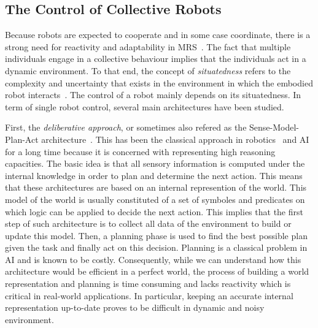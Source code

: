 

  \subsection{The Control of Collective Robots}

    Because robots are expected to cooperate and in some case coordinate, there is a strong need for reactivity and adaptability in MRS~\cite{Iocchi2001, Farinelli2004}. The fact that multiple individuals engage in a collective behaviour implies that the individuals act in a dynamic environment. To that end, the concept of \emph{situatedness} refers to the complexity and uncertainty that exists in the environment in which the embodied robot interacts~\cite{Mataric2008}. The control of a robot mainly depends on its situatedness. In term of single robot control, several main architectures have been studied.

    First, the \emph{deliberative approach}, or sometimes also refered as the Sense-Model-Plan-Act architecture~\cite{Albus1991, Iocchi2001, Mataric2008}. This has been the classical approach in robotics~\cite{Nilsson1984} and AI for a long time because it is concerned with representing high reasoning capacities. The basic idea is that all sensory information is computed under the internal knowledge in order to plan and determine the next action. This means that these architectures are based on an internal represention of the world. This model of the world is usually constituted of a set of symboles and predicates on which logic can be applied to decide the next action. This implies that the first step of such architecture is to collect all data of the environment to build or update this model. Then, a planning phase is used to find the best possible plan given the task and finally act on this decision. Planning is a classical problem in AI and is known to be costly. Consequently, while we can understand how this architecture would be efficient in a perfect world, the process of building a world representation and planning is time consuming and lacks reactivity which is critical in real-world applications. In particular, keeping an accurate internal representation up-to-date proves to be difficult in dynamic and noisy environment.


